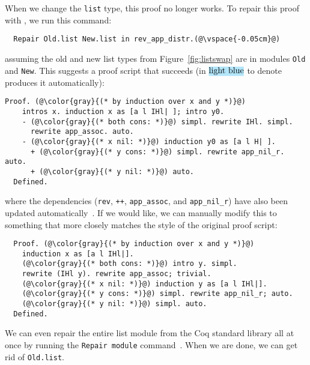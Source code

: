 When we change the \lstinline{list} type, this proof no longer works.
To repair this proof with \toolnamec, we run this command:

\begin{lstlisting}
  Repair Old.list New.list in rev_app_distr.(@\vspace{-0.05cm}@)
\end{lstlisting}
assuming the old and new list types from Figure~\ref{fig:listswap} are in modules \lstinline{Old} and \lstinline{New}.
This suggests a proof script that succeeds (in $\codeauto{light blue}$ to denote \toolnamec produces it automatically):

\begin{lstlisting}[backgroundcolor=\color{cyan!30}]
  Proof. (@\color{gray}{(* by induction over x and y *)}@)
    intros x. induction x as [a l IHl| ]; intro y0.
    - (@\color{gray}{(* both cons: *)}@) simpl. rewrite IHl. simpl.
      rewrite app_assoc. auto.
    - (@\color{gray}{(* x nil: *)}@) induction y0 as [a l H| ].
      + (@\color{gray}{(* y cons: *)}@) simpl. rewrite app_nil_r. auto.
      + (@\color{gray}{(* y nil: *)}@) auto.
  Defined.
\end{lstlisting}
where the dependencies (\lstinline{rev}, \lstinline{++}, \lstinline{app_assoc}, and \lstinline{app_nil_r}) have
also been updated automatically~\href{https://github.com/uwplse/pumpkin-pi/blob/v2.0.0/plugin/coq/Swap.v}{}. %
If we would like, we can manually modify this to something that more closely matches the style of the original proof script:

\begin{lstlisting}
  Proof. (@\color{gray}{(* by induction over x and y *)}@)
    induction x as [a l IHl|].
    (@\color{gray}{(* both cons: *)}@) intro y. simpl.
    rewrite (IHl y). rewrite app_assoc; trivial.
    (@\color{gray}{(* x nil: *)}@) induction y as [a l IHl|].
    (@\color{gray}{(* y cons: *)}@) simpl. rewrite app_nil_r; auto.
    (@\color{gray}{(* y nil: *)}@) simpl. auto.
  Defined.
\end{lstlisting}
We can even repair the entire list module from the Coq standard library all at once by running the \lstinline{Repair module}
command~\href{https://github.com/uwplse/pumpkin-pi/blob/v2.0.0/plugin/coq/Swap.v}{}. %
When we are done, we can get rid of \lstinline{Old.list}. %

